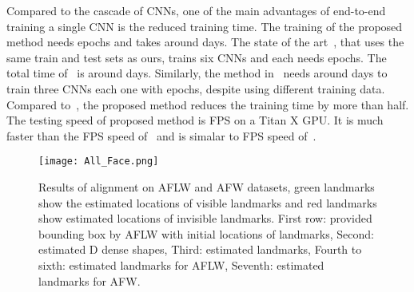 \vspace{-2mm}
\vspace{-2mm}
Compared to the cascade of CNNs, one of the main advantages of end-to-end training a single CNN is the reduced training time. 
The training of the proposed method needs  epochs and takes around  days. 
The state of the art~\cite{jourabloo2016large}, that uses the same train and test sets as ours, trains six CNNs and each needs  epochs. 
The total time of~\cite{jourabloo2016large} is around  days. 
Similarly, the method in~\cite{zhu2015face} needs around  days to train three CNNs each one with  epochs, despite using different training data. 
Compared to~\cite{jourabloo2016large}, the proposed method reduces the training time by more than half.
The testing speed of proposed method is  FPS on a Titan X GPU. It is much faster than the  FPS speed of~\cite{jourabloo2016large} and is simalar to  FPS speed of~\cite{xiao2016robust}. 







































































\begin{figure*}[h!]\small
\begin{center}
\texttt{[image: All\_Face.png]} 
\end{center}

   \caption{Results of alignment on AFLW and AFW datasets, green landmarks show the estimated locations of visible landmarks and red landmarks show estimated locations of invisible landmarks. First row: provided bounding box by AFLW with initial locations of landmarks, Second: estimated D dense shapes, Third: estimated landmarks, Fourth to sixth: estimated landmarks for AFLW, Seventh: estimated landmarks for AFW.}
   \label{figure:ResAFLWAFW1}
\end{figure*}



